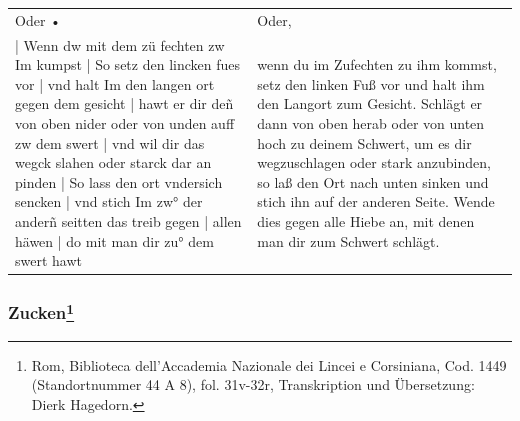 \newpage

\begin{center}
\end{center}

\newpage

\begin{longtable}{p{6.25cm}p{6.25cm}}
Oder • 
&
Oder,
\\
| Wenn dw mit dem zü fechten zw Im kumpst | So setz den lincken fues vor | vnd halt Im den langen ort gegen dem gesicht | hawt er dir deñ von oben nider oder von unden auff zw dem swert | vnd wil dir das wegck slahen oder starck dar an pinden | So lass den ort vndersich sencken | vnd stich Im zw° der anderñ seitten das treib gegen | allen häwen | do mit man dir zu° dem swert hawt
&
wenn du im Zufechten zu ihm kommst, setz den linken Fuß vor und halt ihm den Langort zum Gesicht. Schlägt er dann von oben herab oder von unten hoch zu deinem Schwert, um es dir wegzuschlagen oder stark anzubinden, so laß den Ort nach unten sinken und stich ihn auf der anderen Seite. Wende dies gegen alle Hiebe an, mit denen man dir zum Schwert schlägt.
\end{longtable}

\newpage

\begin{center}
\end{center}

\newpage

\subsubsection[Zucken]{Zucken\footnote{\hspace*{0.5ex}Rom, Biblioteca dell'Accademia Nazionale dei Lincei e Corsiniana, Cod. 1449 (Standortnummer 44 A 8), fol. 31v-32r, Transkription und Übersetzung: Dierk Hagedorn.}}

